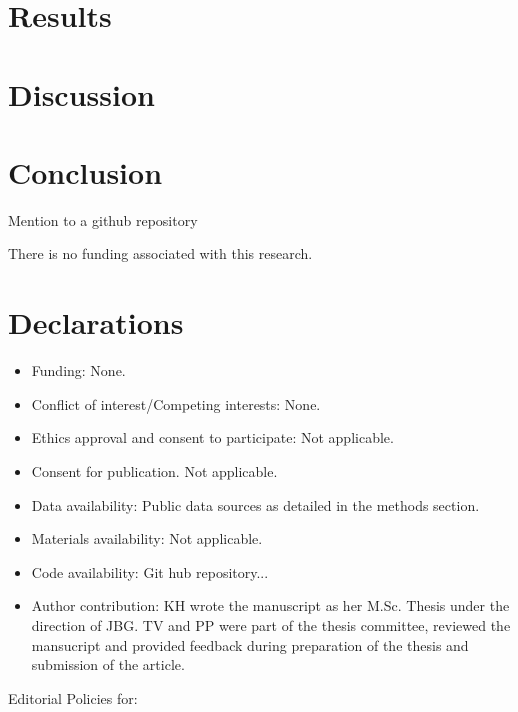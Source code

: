 \documentclass[sn-mathphys-num]{sn-jnl}%
\theoremstyle{thmstyleone}%
\theoremstyle{thmstyletwo}%
\theoremstyle{thmstylethree}%
\begin{document}
{%
\section{Results}\label{sec:Results}

\section{Discussion}\label{sec:Discussion}

\section{Conclusion}\label{sec13}

\backmatter


Mention to a github repository


There is no funding associated with this research. 

\section*{Declarations}

\begin{itemize}
\item Funding: None.
\item Conflict of interest/Competing interests: None.
\item Ethics approval and consent to participate: Not applicable.
\item Consent for publication. Not applicable. 
\item Data availability: Public data sources as detailed in the methods section.  
\item Materials availability: Not applicable.
\item Code availability: Git hub repository...
\item Author contribution: KH wrote the manuscript as her M.Sc. Thesis under the direction of JBG. TV and PP were part of the thesis committee, reviewed the mansucript and provided feedback during preparation of the thesis and submission of the article. 
\end{itemize}

\bigskip
\begin{flushleft}%
Editorial Policies for:


\end{flushleft}}
\end{document}
